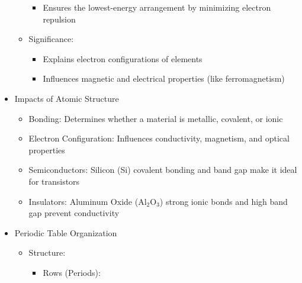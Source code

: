 \begin{itemize}
\begin{itemize}
\begin{itemize}
          \item Ensures the lowest-energy arrangement by minimizing electron repulsion

        \end{itemize}

      \item Significance:

        \begin{itemize}

          \item Explains electron configurations of elements

          \item Influences magnetic and electrical properties (like ferromagnetism)

        \end{itemize}

    \end{itemize}

  \item Impacts of Atomic Structure

    \begin{itemize}

      \item Bonding: Determines whether a material is metallic, covalent, or ionic

      \item Electron Configuration: Influences conductivity, magnetism, and optical properties

      \item Semiconductors: Silicon (Si) covalent bonding and band gap make it ideal for transistors

      \item Insulators: Aluminum Oxide (Al$_2$O$_3$) strong ionic bonds and high band gap prevent conductivity

    \end{itemize}

  \item Periodic Table Organization

    \begin{itemize}

      \item Structure:

        \begin{itemize}

          \item Rows (Periods):

            \begin{itemize}


\end{itemize}
\end{itemize}
\end{itemize}
\end{itemize}
